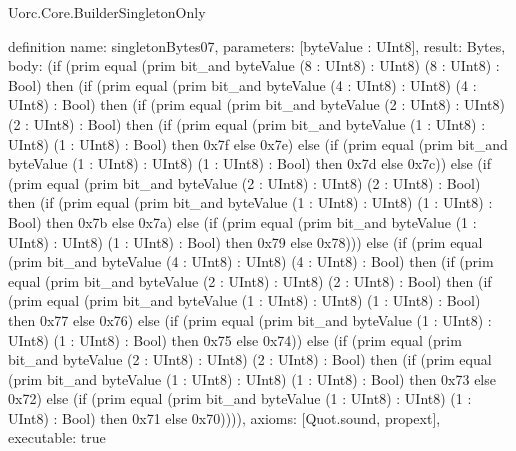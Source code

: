 \begin{lexlean}{Uorc.Core.BuilderSingletonOnly}
\begin{semanticmodule}
definition{
  name: singletonBytes07,
  parameters: [byteValue : UInt8],
  result: Bytes,
  body: (if (prim equal (prim bit_and byteValue (8 : UInt8) : UInt8) (8 : UInt8) : Bool) then (if (prim equal (prim bit_and byteValue (4 : UInt8) : UInt8) (4 : UInt8) : Bool) then (if (prim equal (prim bit_and byteValue (2 : UInt8) : UInt8) (2 : UInt8) : Bool) then (if (prim equal (prim bit_and byteValue (1 : UInt8) : UInt8) (1 : UInt8) : Bool) then 0x7f else 0x7e) else (if (prim equal (prim bit_and byteValue (1 : UInt8) : UInt8) (1 : UInt8) : Bool) then 0x7d else 0x7c)) else (if (prim equal (prim bit_and byteValue (2 : UInt8) : UInt8) (2 : UInt8) : Bool) then (if (prim equal (prim bit_and byteValue (1 : UInt8) : UInt8) (1 : UInt8) : Bool) then 0x7b else 0x7a) else (if (prim equal (prim bit_and byteValue (1 : UInt8) : UInt8) (1 : UInt8) : Bool) then 0x79 else 0x78))) else (if (prim equal (prim bit_and byteValue (4 : UInt8) : UInt8) (4 : UInt8) : Bool) then (if (prim equal (prim bit_and byteValue (2 : UInt8) : UInt8) (2 : UInt8) : Bool) then (if (prim equal (prim bit_and byteValue (1 : UInt8) : UInt8) (1 : UInt8) : Bool) then 0x77 else 0x76) else (if (prim equal (prim bit_and byteValue (1 : UInt8) : UInt8) (1 : UInt8) : Bool) then 0x75 else 0x74)) else (if (prim equal (prim bit_and byteValue (2 : UInt8) : UInt8) (2 : UInt8) : Bool) then (if (prim equal (prim bit_and byteValue (1 : UInt8) : UInt8) (1 : UInt8) : Bool) then 0x73 else 0x72) else (if (prim equal (prim bit_and byteValue (1 : UInt8) : UInt8) (1 : UInt8) : Bool) then 0x71 else 0x70)))),
  axioms: [Quot.sound, propext],
  executable: true
}


\end{semanticmodule}
\end{lexlean}
